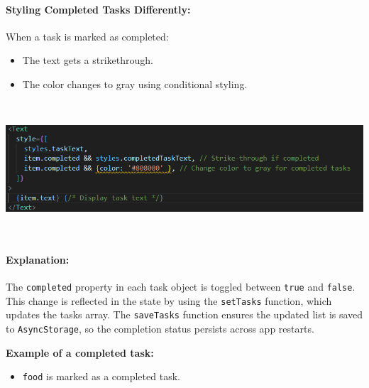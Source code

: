 \documentclass[12pt]{article}
\begin{document}
\paragraph{Styling Completed Tasks Differently:}
When a task is marked as completed:
\begin{itemize}
    \item The text gets a strikethrough.
    \item The color changes to gray using conditional styling.
\end{itemize}
\begin{center}
    \includegraphics[width=1\textwidth, height=5cm]{images/stylecompletedtask.png} 
\end{center}

\paragraph{Explanation:}
The \texttt{completed} property in each task object is toggled between \texttt{true} and \texttt{false}. This change is reflected in the state by using the \texttt{setTasks} function, which updates the tasks array. The \texttt{saveTasks} function ensures the updated list is saved to \texttt{AsyncStorage}, so the completion status persists across app restarts.

\textbf{Example of a completed task:}
\begin{itemize}
    \item \texttt{food} is marked as a completed task.
\end{itemize}
\end{document}
